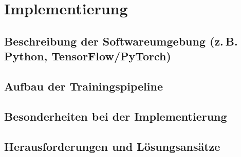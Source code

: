 \chapter{Implementierung} 

\label{Implementierung}

\section{Beschreibung der Softwareumgebung (z. B. Python, TensorFlow/PyTorch)}
\section{Aufbau der Trainingspipeline}
\section{Besonderheiten bei der Implementierung}
\section{Herausforderungen und Lösungsansätze}